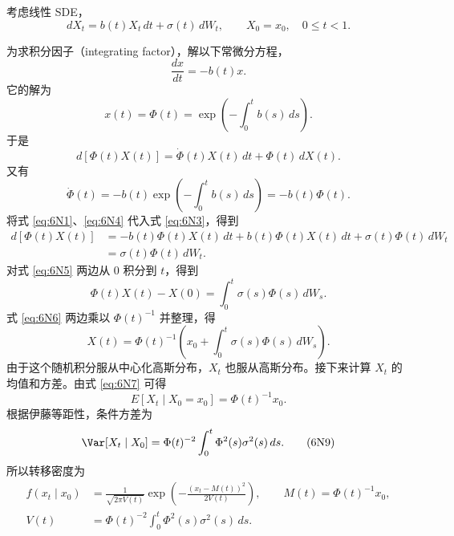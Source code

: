 

考虑线性 SDE，
\begin{equation*}
  dX_t=b(t)X_t\,dt+\sigma(t)\,dW_t,\qquad X_0=x_0,\quad 0\leq t<1.
  \tag{6N1}\label{eq:6N1}
\end{equation*}

为求积分因子（integrating factor），解以下常微分方程，
\[
  \frac{dx}{dt}=-b(t)x.
\]
它的解为
\begin{equation*}
  x(t)=\Phi(t)=\exp\left(-\int_0^t b(s)\,ds\right).
  \tag{6N2}\label{eq:6N2}
\end{equation*}
于是
\begin{equation*}
  d[\Phi(t)X(t)]=\dot\Phi(t)X(t)\,dt+\Phi(t)\,dX(t).
  \tag{6N3}\label{eq:6N3}
\end{equation*}
又有
\begin{equation*}
  \dot\Phi(t)=-b(t)\exp\left(-\int_0^t b(s)\,ds\right)=-b(t)\Phi(t).
  \tag{6N4}\label{eq:6N4}
\end{equation*}
将式 \eqref{eq:6N1}、\eqref{eq:6N4} 代入式 \eqref{eq:6N3}，得到
\begin{equation*}
  \begin{aligned}
  d[\Phi(t)X(t)]
    &=-b(t)\Phi(t)X(t)\,dt+b(t)\Phi(t)X(t)\,dt+\sigma(t)\Phi(t)\,dW_t\\
    &=\sigma(t)\Phi(t)\,dW_t.
  \end{aligned}
  \tag{6N5}\label{eq:6N5}
\end{equation*}
对式 \eqref{eq:6N5} 两边从 0 积分到 $t$，得到
\begin{equation*}
  \Phi(t)X(t)-X(0)=\int_0^t\sigma(s)\Phi(s)\,dW_s.
  \tag{6N6}\label{eq:6N6}
\end{equation*}
式 \eqref{eq:6N6} 两边乘以 $\Phi(t)^{-1}$ 并整理，得
\begin{equation*}
  X(t)=\Phi(t)^{-1}\left(x_0+\int_0^t\sigma(s)\Phi(s)\,dW_s\right).
  \tag{6N7}\label{eq:6N7}
\end{equation*}
由于这个随机积分服从中心化高斯分布，$X_t$ 也服从高斯分布。接下来计算 $X_t$ 的均值和方差。由式 \eqref{eq:6N7} 可得
\begin{equation*}
  E[X_t\mid X_0=x_0]=\Phi(t)^{-1}x_0.
  \tag{6N8}\label{eq:6N8}
\end{equation*}
根据伊藤等距性，条件方差为
\begin{equation*}
  \Var[X_t\mid X_0]=\Phi(t)^{-2}\int_0^t\Phi^2(s)\sigma^2(s)\,ds.
  \tag{6N9}\label{eq:6N9}
\end{equation*}
所以转移密度为
\begin{equation*}
  \begin{aligned}
  f(x_t\mid x_0)&=\frac{1}{\sqrt{2\pi V(t)}}
        \exp\left(-\frac{(x_t-M(t))^2}{2V(t)}\right),
          \qquad M(t)=\Phi(t)^{-1}x_0,\\
  V(t)&=\Phi(t)^{-2}\int_0^t\Phi^2(s)\sigma^2(s)\,ds.
  \end{aligned}
  \tag{6N10}\label{eq:6N10}
\end{equation*}


